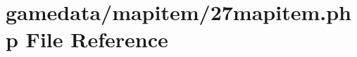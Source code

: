\hypertarget{27mapitem_8php}{\section{gamedata/mapitem/27mapitem.php File Reference}
\label{27mapitem_8php}
}
